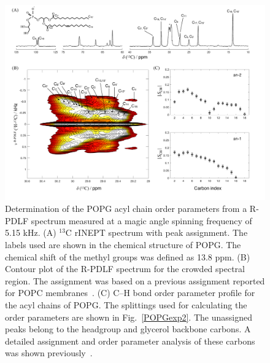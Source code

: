 \documentclass[fleqn,10pt]{wlscirepSI}
\begin{document}
\begin{figure}[p]
  \includegraphics[width=\textwidth]{Figures/POPG_INEPT_contour_SCH.pdf}
  \caption{Determination of the POPG acyl chain order parameters from a R-PDLF spectrum measured at a magic angle spinning frequency of 5.15 kHz. (A) $^{13}$C rINEPT spectrum with peak assignment. The labels used are shown in the chemical structure of POPG. The chemical shift of the methyl groups was defined as 13.8 ppm. (B) Contour plot of the R-PDLF spectrum for the crowded spectral region. The assignment was based on a previous assignment reported for POPC membranes~\cite{ferreira13}. (C) C--H bond order parameter profile for the acyl chains of POPG. The splittings used for calculating the order parameters are shown in Fig.~\ref{POPGexp2}. The unassigned peaks belong to the headgroup and glycerol backbone carbons. A detailed assignment and order parameter analysis of these carbons was shown previously~\cite{bacle21}.}
  \label{POPGexp1}
\end{figure}
\end{document}

